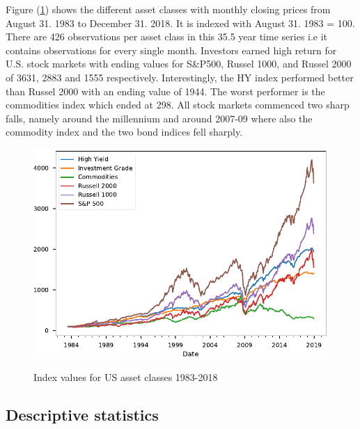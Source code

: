 \documentclass[11pt,a4paper,oneside]{article}
\begin{document}
Figure (\ref{index_levels}) shows the different asset classes with monthly closing prices from August 31. 1983 to December 31. 2018. It is indexed with August 31. 1983 = 100. There are 426 observations per asset class in this 35.5 year time series i.e it contains observations for every single month. Investors earned high return for U.S. stock markets with ending values for S\&P500, Russel 1000, and Russel 2000 of 3631, 2883 and 1555 respectively. Interestingly, the HY index performed better than Russel 2000 with an ending value of 1944. The worst performer is the commodities index which ended at 298. All stock markets commenced two sharp falls, namely around the millennium and around 2007-09 where also the commodity index and the two bond indices fell sharply.       
\begin{figure}[ht]
\center
\vspace{5mm}
\caption{Index values for US asset classes 1983-2018}
\label{index_levels}
\includegraphics[scale=0.9]{images/Prices.pdf}
\begingroup
{}
\endgroup
\end{figure}


\clearpage
\subsection{Descriptive statistics}\label{descriptivesection}
\end{document}
